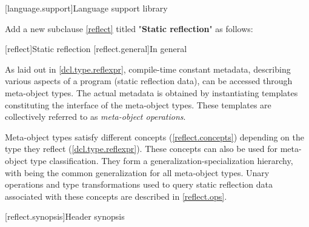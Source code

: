 
[language.support]{Language support library}

\pnum
Add a new subclause \ref{reflect} titled "\textbf{Static reflection}" as follows:

\setcounter{section}{11}

[reflect]{Static reflection}
[reflect.general]{In general}

\begin{std.txt}\color{addclr}

\pnum
As laid out in \ref{dcl.type.reflexpr}, compile-time constant metadata,
describing various aspects of a program (static reflection data), can be
accessed through meta-object types.  The actual metadata is obtained by
instantiating templates constituting the interface of the meta-object types.
These templates are collectively referred to as \emph{meta-object operations}.

\pnum
Meta-object types satisfy different concepts (\ref{reflect.concepts}) depending on the type
they reflect (\ref{dcl.type.reflexpr}).  These concepts can also be used for
meta-object type classification.  They form a generalization-specialization
hierarchy, with  being the common generalization for all
meta-object types.  Unary operations and type transformations used to query
static reflection data associated with these concepts are described in
\ref{reflect.ops}.
  
\end{std.txt}

[reflect.synopsis]{Header  synopsis}

